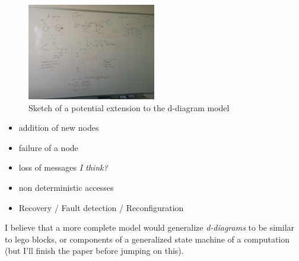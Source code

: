 \begin{figure}[t]
    \includegraphics[width=0.50\textwidth]{fig/espace}

    \caption{Sketch of a potential extension to the d-diagram model}

\label{fig:espace} 
\end{figure}


\begin{itemize}

\item{addition of new nodes}

\item{failure of a node}

\item{loss of messages \textit{I think?}}

\item{non deterministic accesses}

\item{Recovery / Fault detection / Reconfiguration}

\end{itemize}

I believe that a more complete model would generalize \textit{d-diagrams} to be
similar to lego blocks, or components of a generalized state machine of a
computation (but I'll finish the paper before jumping on this).


